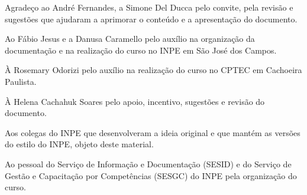 
\begin{agradecimentos}  %

\hypertarget{estilo:agradecimentos}{} 
Agradeço ao André Fernandes, a Simone Del Ducca pelo convite, pela revisão e sugestões que ajudaram a aprimorar  o conteúdo e a apresentação do documento. 

Ao Fábio Jesus e a Danusa Caramello pelo auxílio na organização da documentação e na realização do curso no INPE em São José dos Campos. 

À Rosemary Odorizi pelo auxílio na realização do curso no CPTEC em Cachoeira Paulista.

À Helena Cachahuk Soares pelo apoio, incentivo, sugestões e revisão do documento.

Aos colegas do INPE que desenvolveram a ideia original e que mantém as versões do estilo do INPE, objeto deste material.

Ao pessoal do Serviço de Informação e Documentação (SESID) e do Serviço de Gestão e Capacitação por Competências (SESGC) do INPE pela organização do curso.

\end{agradecimentos}
